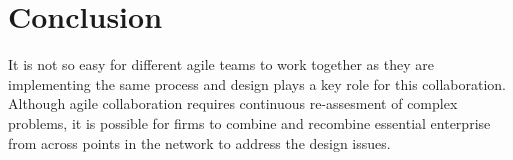 \documentclass[sigconf]{acmart}
\begin{document}
\section{Conclusion}
It is not so easy for different agile teams to work together as they are implementing the same process and design plays a key role for this collaboration. Although agile collaboration requires continuous re-assesment of complex problems, it is possible for firms to combine and recombine essential enterprise from across points in the network to address the design issues.  

%

\end{document}
